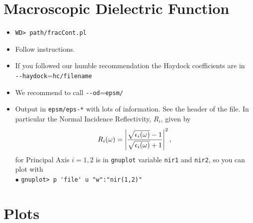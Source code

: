\documentclass[preprint,12pt]{revtex4}
\begin{document}
\section{Macroscopic Dielectric Function}
\begin{itemize}
\item \verb=WD> path/fracCont.pl=
\item Follow instructions. 
\item If you followed our humble recommendation the Haydock
  coefficients are in \\
 \verb=--haydock==\verb=hc/filename=
\item We recommend to call \verb=--od==\verb=epsm/=
\item  Output in \verb=epsm/eps-*= with lots of information.
 See the header of the file. In particular the
 Normal Incidence Reflectivity, $R_i$, given by
\begin{equation}\label{nir}
R_i(\omega)=\left|\frac{\sqrt{\epsilon_i(\omega)}-1}{\sqrt{\epsilon_i(\omega)}+1}\right|^2
,
\end{equation}
for Principal Axis $i=1,2$ is in \verb=gnuplot= variable \verb=nir1=
and \verb=nir2=, so you can plot with\\
$\bullet$ \verb=gnuplot> p 'file' u "w":"nir(1,2)"=
\end{itemize}

\section{Plots}
\end{document}

